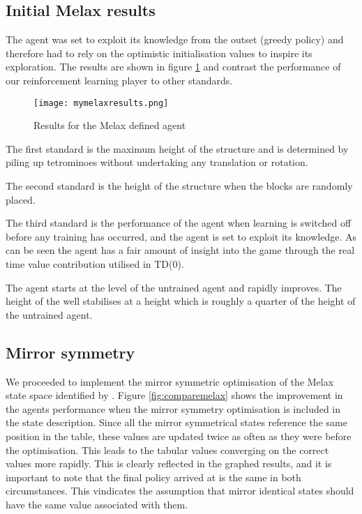 \documentclass{rucsthesis}
\begin{document}
\subsection{Initial Melax results}

The agent was set to exploit its knowledge from the outset (greedy policy) and therefore had to rely on the optimistic initialisation values to inspire its exploration. The results are shown in figure \ref{fig:mymelaxresults} and contrast the performance of our reinforcement learning player to other standards. 

\begin{figure}[h]
\centering
\texttt{[image: mymelaxresults.png]}
\caption{Results for the Melax defined agent}
\label{fig:mymelaxresults}
\end{figure}

The first standard is the maximum height of the structure and is determined by piling up tetrominoes without undertaking any translation or rotation.

The second standard is the height of the structure when the blocks are randomly placed.

The third standard is the performance of the agent when learning is switched off before any training has occurred, and the agent is set to exploit its knowledge. As can be seen the agent has a fair amount of insight into the game through the real time value contribution utilised in TD(0). 

The agent starts at the level of the untrained agent and rapidly improves. The height of the well stabilises at a height which is roughly a quarter of the height of the untrained agent.

\subsection{Mirror symmetry}

We proceeded to implement the mirror symmetric optimisation of the Melax state space identified by \cite{yaeltetris}. Figure \ref{fig:comparemelax} shows the improvement in the agents performance when the mirror symmetry optimisation is included in the state description. Since all the mirror symmetrical states reference the same position in the table, these values are updated twice as often as they were before the optimisation. This leads to the tabular values converging on the correct values more rapidly. This is clearly reflected in the graphed results, and it is important to note that the final policy arrived at is the same in both circumstances. This vindicates the assumption that mirror identical states should have the same value associated with them.
\end{document}
